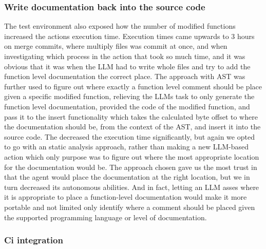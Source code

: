\subsubsection*{Write documentation back into the source code}
The test environment also exposed how the number of modified functions increased the actions execution time.
Execution times came upwards to 3 hours on merge commits, where multiply files was commit at once, and when investigating which process in the action that took so much time, and it was obvious that it was when the LLM had to write whole files and try to add the function level documentation the correct place. The approach with AST was further used to figure out where exactly a function level comment should be place given a specific modified function, relieving the LLMs task to only generate the function level documentation, provided the code of the modified function, and pass it to the insert functionality which takes the calculated byte offset to where the documentation should be, from the context of the AST, and insert it into the source code. The decreased the execution time significantly, but again we opted to go with an static analysis approach, rather than making a new LLM-based action which only purpose was to figure out where the most appropriate location for the documentation would be. The approach chosen gave us the most trust in that the agent would place the documentation at the right location, but we in turn decreased its autonomous abilities. And in fact, letting an LLM asses where it is appropriate to place a function-level documentation would make it more portable and not limited only identify where a comment should be placed given the supported programming language or level of documentation.
\subsubsection*{Ci integration}


